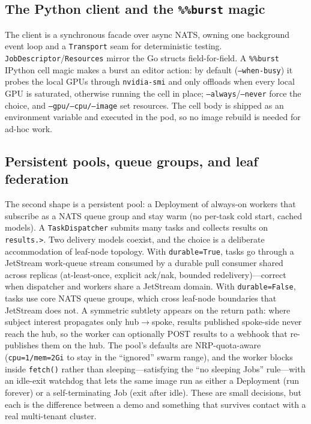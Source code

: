 \documentclass[conference]{IEEEtran}
\begin{document}
\subsection{The Python client and the \texttt{\%\%burst} magic}
The client is a synchronous facade over async NATS, owning one background event loop and a
\texttt{Transport} seam for deterministic testing. \texttt{JobDescriptor}/\texttt{Resources}
mirror the Go structs field-for-field. A \texttt{\%\%burst} IPython cell magic makes a burst an
editor action: by default (\texttt{--when-busy}) it probes the local GPUs through
\texttt{nvidia-smi} and only offloads when every local GPU is saturated, otherwise running the
cell in place; \texttt{--always}/\texttt{--never} force the choice, and \texttt{--gpu/--cpu/--image}
set resources. The cell body is shipped as an environment variable and executed in the pod, so
no image rebuild is needed for ad-hoc work.

\subsection{Persistent pools, queue groups, and leaf federation}
The second shape is a persistent pool: a Deployment of always-on workers that subscribe as a NATS
queue group and stay warm (no per-task cold start, cached models). A \texttt{TaskDispatcher}
submits many tasks and collects results on \texttt{results.\textgreater}. Two delivery models
coexist, and the choice is a deliberate accommodation of leaf-node topology. With
\texttt{durable=True}, tasks go through a JetStream work-queue stream consumed by a durable pull
consumer shared across replicas (at-least-once, explicit ack/nak, bounded redelivery)---correct
when dispatcher and workers share a JetStream domain. With \texttt{durable=False}, tasks use core
NATS queue groups, which cross leaf-node boundaries that JetStream does not. A symmetric subtlety
appears on the return path: where subject interest propagates only hub$\to$spoke, results
published spoke-side never reach the hub, so the worker can optionally POST results to a webhook
that re-publishes them on the hub. The pool's defaults are NRP-quota-aware
(\texttt{cpu=1/mem=2Gi} to stay in the ``ignored'' swarm range), and the worker blocks inside
\texttt{fetch()} rather than sleeping---satisfying the ``no sleeping Jobs'' rule---with an
idle-exit watchdog that lets the same image run as either a Deployment (run forever) or a
self-terminating Job (exit after idle). These are small decisions, but each is the difference
between a demo and something that survives contact with a real multi-tenant cluster.
\end{document}
